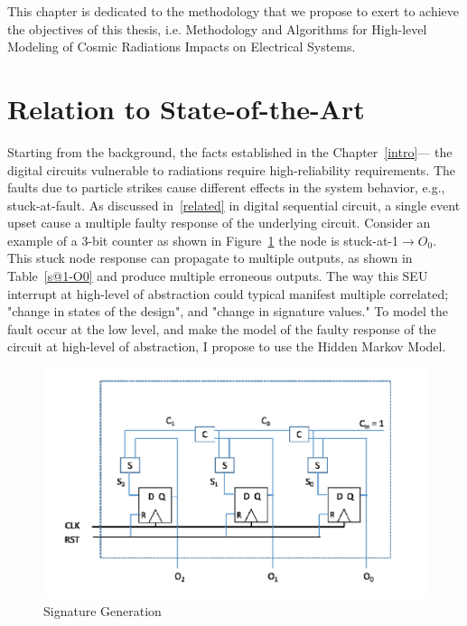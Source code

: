 
This chapter is dedicated to the methodology that we propose to exert to achieve the objectives of this thesis, i.e. Methodology and Algorithms for High-level Modeling of Cosmic Radiations Impacts on Electrical Systems.



\section{Relation to State-of-the-Art}
Starting from the background, the facts established in the Chapter~\ref{intro}--- the digital circuits vulnerable to radiations require high-reliability requirements. The faults due to particle strikes cause different effects in the system behavior, e.g., stuck-at-fault. As discussed in~\ref{related} in digital sequential circuit, a single event upset cause a multiple faulty response of the underlying circuit. Consider an example of  a 3-bit counter as shown in Figure~\ref{fig:counter} the node is stuck-at-1$\rightarrow O_0$. This stuck node response can propagate to multiple outputs, as shown in Table~\ref{s@1-O0} and produce multiple erroneous outputs. The way this SEU interrupt at high-level of abstraction could typical manifest multiple correlated; "change in states of the design", and "change in signature values." To model the fault occur at the low level, and make the model of the faulty response of the circuit at high-level of abstraction, I propose to use the Hidden Markov Model. 



\begin{figure}[tb!]

 \centering
  \captionsetup{justification=centering}    
   \includegraphics[scale=0.6]{Figures/counter.png}
   \caption{Signature Generation}
\label{fig:counter}
\end{figure}



